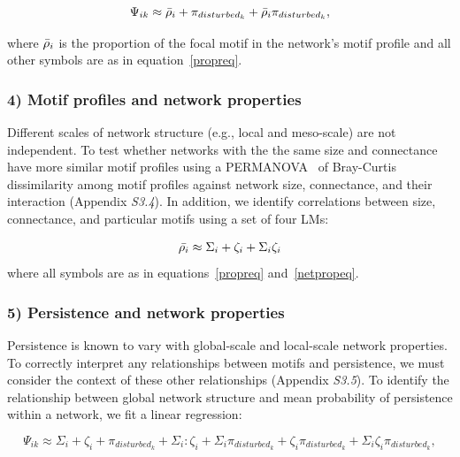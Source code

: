 \documentclass[12pt]{article}
\begin{document}
\begin{spacing}{2.0}
            \begin{equation}
                \Psi_{ik} \approx \Bar{\rho}_{i} + \pi_{disturbed_k} + \Bar{\rho}_{i}\pi_{disturbed_k},
                \label{netpropeq}
            \end{equation}
        
        where $\Bar{\rho}_{i}$ is the proportion of the focal motif in the network's motif profile and all other symbols are as in equation~\ref{propreq}.
            
    \subsubsection*{4) Motif profiles and network properties}
    
        Different scales of network structure (e.g., local and meso-scale) are not independent. 
        To test whether networks with the the same size and connectance have more similar motif profiles using a PERMANOVA~\citep{Anderson2001} of Bray-Curtis dissimilarity among motif profiles against network size, connectance, and their interaction (Appendix \emph{S3.4}). 
        In addition, we identify correlations between size, connectance, and particular motifs using a set of four LMs:
        
        \begin{equation}
            \Bar{\rho_{i}} \approx \Sigma_{i} + \zeta_{i} + \Sigma_{i}\zeta_{i}
        \end{equation}
        where all symbols are as in equations~\ref{propreq} and~\ref{netpropeq}.
        
    \subsubsection*{5) Persistence and network properties}
        
        Persistence is known to vary with global-scale and local-scale network properties.
        To correctly interpret any relationships between motifs and persistence, we must consider the context of these other relationships (Appendix \emph{S3.5}).
        To identify the relationship between global network structure and mean probability of persistence within a network, we fit a linear regression:

            \begin{equation}
                \Psi_{ik} \approx \Sigma_{i} + \zeta_{i} + \pi_{disturbed_k} + \Sigma_{i}:\zeta_{i} + \Sigma_{i}\pi_{disturbed_k} + \zeta_{i}\pi_{disturbed_k} + \Sigma_{i}\zeta_{i}\pi_{disturbed_k},
                \label{SCeq}
            \end{equation}


\end{spacing}
\end{document}
